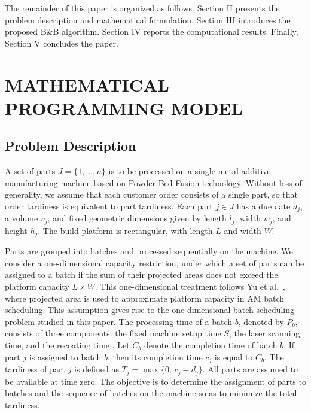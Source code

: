 \documentclass[letterpaper, 10 pt, conference]{ieeeconf}  %
\begin{document}
The remainder of this paper is organized as follows. Section II presents the problem description and mathematical formulation. Section III introduces the proposed B\&B algorithm. Section IV reports the computational results. Finally, Section V concludes the paper.

\section{MATHEMATICAL PROGRAMMING MODEL}

\subsection{Problem Description}

A set of parts $J=\{1,\dots,n\}$ is to be processed on a single metal additive manufacturing machine based on Powder Bed Fusion technology. Without loss of generality, we assume that each customer order consists of a single part, so that order tardiness is equivalent to part tardiness. Each part $j \in J$ has a due date $d_j$, a volume $v_j$, and fixed geometric dimensions given by length $l_j$, width $w_j$, and height $h_j$. The build platform is rectangular, with length $L$ and width $W$.

Parts are grouped into batches and processed sequentially on the machine. We consider a one-dimensional capacity restriction, under which a set of parts can be assigned to a batch if the sum of their projected areas does not exceed the platform capacity $L \times W$. This one-dimensional treatment follows Yu et al.~\cite{yuMathematicalModelsMinimizing2022}, where projected area is used to approximate platform capacity in AM batch scheduling. This assumption gives rise to the one-dimensional batch scheduling problem studied in this paper. The processing time of a batch $b$, denoted by $P_b$, consists of three components: the fixed machine setup time $S$, the laser scanning time, and the recoating time \cite{cheMachineSchedulingOrientation2021}. Let $C_b$ denote the completion time of batch $b$. If part $j$ is assigned to batch $b$, then its completion time $c_j$ is equal to $C_b$. The tardiness of part $j$ is defined as $T_j=\max\{0,\,c_j-d_j\}$. All parts are assumed to be available at time zero. The objective is to determine the assignment of parts to batches and the sequence of batches on the machine so as to minimize the total tardiness.
\end{document}
